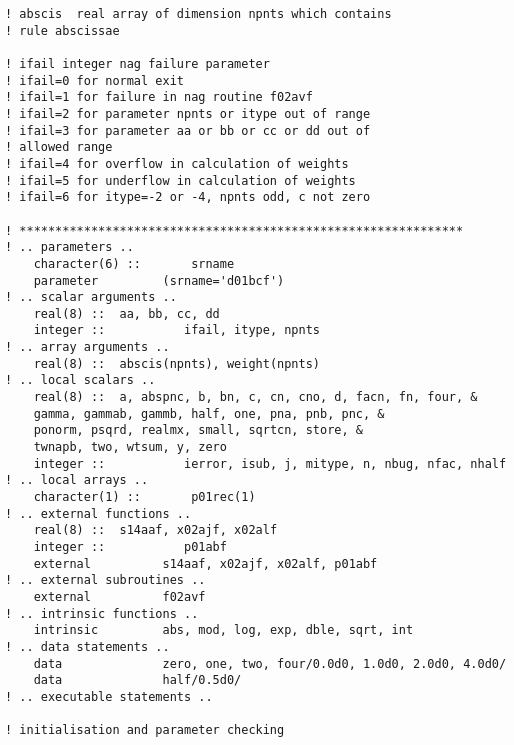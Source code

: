 \documentclass[12pt]{article}
\begin{document}
\begin{lstlisting}[frame=single,caption={{\tt d01b.f90}},label=d01b]
! abscis  real array of dimension npnts which contains
! rule abscissae

! ifail integer nag failure parameter
! ifail=0 for normal exit
! ifail=1 for failure in nag routine f02avf
! ifail=2 for parameter npnts or itype out of range
! ifail=3 for parameter aa or bb or cc or dd out of
! allowed range
! ifail=4 for overflow in calculation of weights
! ifail=5 for underflow in calculation of weights
! ifail=6 for itype=-2 or -4, npnts odd, c not zero

! **************************************************************
! .. parameters ..
    character(6) ::       srname
    parameter         (srname='d01bcf')
! .. scalar arguments ..
    real(8) ::  aa, bb, cc, dd
    integer ::           ifail, itype, npnts
! .. array arguments ..
    real(8) ::  abscis(npnts), weight(npnts)
! .. local scalars ..
    real(8) ::  a, abspnc, b, bn, c, cn, cno, d, facn, fn, four, &
    gamma, gammab, gammb, half, one, pna, pnb, pnc, &
    ponorm, psqrd, realmx, small, sqrtcn, store, &
    twnapb, two, wtsum, y, zero
    integer ::           ierror, isub, j, mitype, n, nbug, nfac, nhalf
! .. local arrays ..
    character(1) ::       p01rec(1)
! .. external functions ..
    real(8) ::  s14aaf, x02ajf, x02alf
    integer ::           p01abf
    external          s14aaf, x02ajf, x02alf, p01abf
! .. external subroutines ..
    external          f02avf
! .. intrinsic functions ..
    intrinsic         abs, mod, log, exp, dble, sqrt, int
! .. data statements ..
    data              zero, one, two, four/0.0d0, 1.0d0, 2.0d0, 4.0d0/
    data              half/0.5d0/
! .. executable statements ..

! initialisation and parameter checking


\end{lstlisting}
\end{document}
